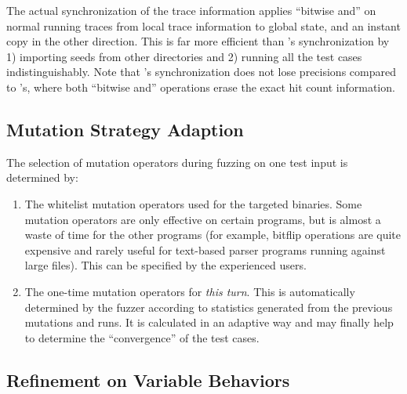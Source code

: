 The actual synchronization of the trace information applies ``bitwise and'' on normal running traces from local trace information to global state, and an instant copy in the other direction. This is far more efficient than {\AFL}'s synchronization by 1) importing seeds from other directories and 2) running all the test cases indistinguishably. Note that {\FOT}'s synchronization does not lose precisions compared to {\AFL}'s, where both ``bitwise and'' operations erase the exact hit count information.


  \subsection{Mutation Strategy Adaption}\label{sec:mutation_ops}
 The selection of mutation operators during fuzzing on one test input is determined by:
 \begin{enumerate}[1.]
 	\item The whitelist mutation operators used for the targeted binaries. Some mutation operators are only effective on certain programs, but is almost a waste of time for the other programs (for example, bitflip operations are quite expensive and rarely useful for text-based parser programs running against large files). This can be specified by the experienced {\FOT} users.
 	\item The one-time mutation operators for \emph{this turn}. This is automatically determined by the fuzzer according to statistics generated from the previous mutations and runs. It is calculated in an adaptive way and may finally help to determine the ``convergence'' of the test cases.
 \end{enumerate}



\subsection{Refinement on Variable Behaviors}\label{sec:entry_var_behavior}


